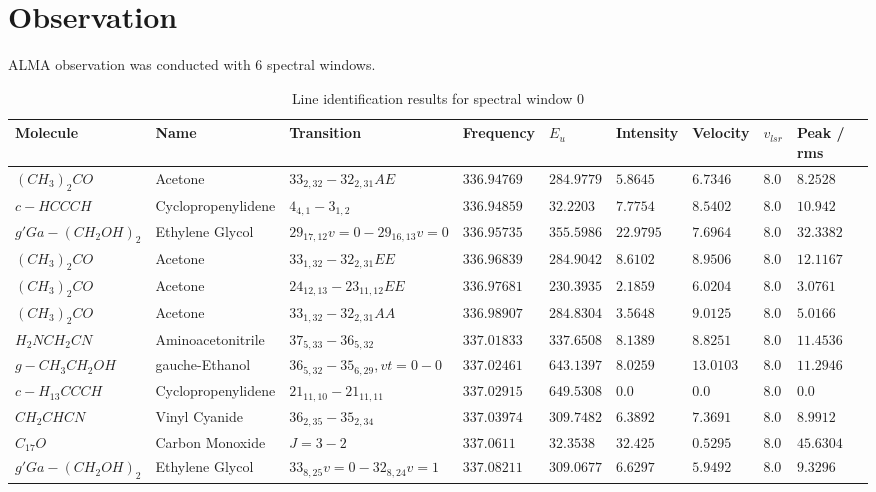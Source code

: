 \documentclass{aa}
\begin{document}
\section{Observation}
   ALMA observation was conducted with 6 spectral windows.
\begin{table}   
 \label{table:1}  
     \caption{Line identification results for spectral window 0}
 \tiny
    \centering    
    \begin{tabular}{l l l l l l l l l} 
    \hline    
    Molecule & Name &Transition & Frequency & $E_{u}$ & Intensity & Velocity & $v_{lsr}$ & Peak / rms\\ 
    \hline   
$(CH_{3})_{2}CO$ & Acetone & $33_{2,32}-32_{2,31}AE$ & $336.94769$ & $284.9779$ & $5.8645$ & $6.7346$ & $8.0$ & $8.2528$\\
$c-HCCCH$ & Cyclopropenylidene & $4_{4,1}-3_{1,2}$ & $336.94859$ & $32.2203$ & $7.7754$ & $8.5402$ & $8.0$ & $10.942$\\
$g'Ga-(CH_{2}OH)_{2}$ & Ethylene Glycol & $29_{17,12}v=0-29_{16,13}v=0$ & $336.95735$ & $355.5986$ & $22.9795$ & $7.6964$ & $8.0$ & $32.3382$\\
$(CH_{3})_{2}CO$ & Acetone & $33_{1,32}-32_{2,31}EE$ & $336.96839$ & $284.9042$ & $8.6102$ & $8.9506$ & $8.0$ & $12.1167$\\
$(CH_{3})_{2}CO$ & Acetone & $24_{12,13}-23_{11,12}EE$ & $336.97681$ & $230.3935$ & $2.1859$ & $6.0204$ & $8.0$ & $3.0761$\\
$(CH_{3})_{2}CO$ & Acetone & $33_{1,32}-32_{2,31}AA$ & $336.98907$ & $284.8304$ & $3.5648$ & $9.0125$ & $8.0$ & $5.0166$\\
$H_{2}NCH_{2}CN$ & Aminoacetonitrile & $37_{5,33}-36_{5,32}$ & $337.01833$ & $337.6508$ & $8.1389$ & $8.8251$ & $8.0$ & $11.4536$\\
$g-CH_{3}CH_{2}OH$ & gauche-Ethanol & $36_{5,32}-35_{6,29},vt=0-0$ & $337.02461$ & $643.1397$ & $8.0259$ & $13.0103$ & $8.0$ & $11.2946$\\
$c-H_{13}CCCH$ & Cyclopropenylidene & $21_{11,10}-21_{11,11}$ & $337.02915$ & $649.5308$ & $0.0$ & $0.0$ & $8.0$ & $0.0$\\
$CH_{2}CHCN$ & Vinyl Cyanide & $36_{2,35}-35_{2,34}$ & $337.03974$ & $309.7482$ & $6.3892$ & $7.3691$ & $8.0$ & $8.9912$\\
$C_{17}O$ & Carbon Monoxide & $J=3-2$ & $337.0611$ & $32.3538$ & $32.425$ & $0.5295$ & $8.0$ & $45.6304$\\
$g'Ga-(CH_{2}OH)_{2}$ & Ethylene Glycol & $33_{8,25}v=0-32_{8,24}v=1$ & $337.08211$ & $309.0677$ & $6.6297$ & $5.9492$ & $8.0$ & $9.3296$\\

\end{tabular}
\end{table}
\end{document}
